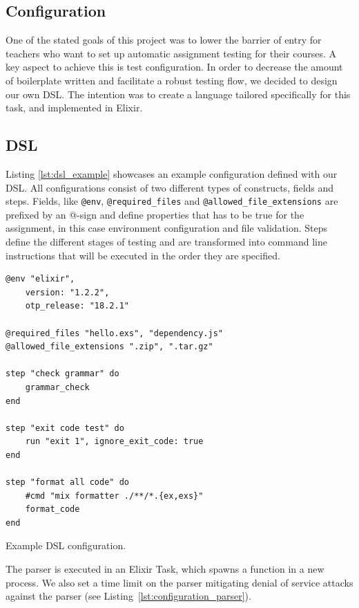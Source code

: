 \subsection{Configuration}
One of the stated goals of this project was to lower the barrier of entry for teachers who want to set up automatic assignment testing for their courses. A key aspect to achieve this is test configuration. In order to decrease the amount of boilerplate written and facilitate a robust testing flow, we decided to design our own DSL. The intention was to create a language tailored specifically for this task, and implemented in Elixir.


\subsection{DSL}
Listing \ref{lst:dsl_example} showcases an example configuration defined with our DSL. All configurations consist of two different types of constructs, fields and steps. Fields, like \texttt{@env}, \texttt{@required_files} and \texttt{@allowed_file_extensions} are prefixed by an @-sign and define properties that has to be true for the assignment, in this case environment configuration and file validation. Steps define the different stages of testing and are transformed into command line instructions that will be executed in the order they are specified.

\begin{listing}
\begin{verbatim}
@env "elixir",
	version: "1.2.2",
	otp_release: "18.2.1"

@required_files "hello.exs", "dependency.js"
@allowed_file_extensions ".zip", ".tar.gz"

step "check grammar" do
	grammar_check
end

step "exit code test" do
	run "exit 1", ignore_exit_code: true
end

step "format all code" do
	#cmd "mix formatter ./**/*.{ex,exs}"
	format_code
end
\end{verbatim}
\caption{Example DSL configuration.}
\label{lst:dsl_example}
\end{listing}


The parser is executed in an Elixir Task, which spawns a function in a new process. We also set a time limit on the parser mitigating denial of service attacks against the parser (see Listing~\ref{lst:configuration_parser}).

